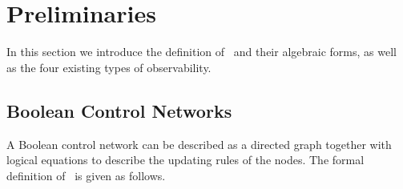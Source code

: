 \section{Preliminaries} 
\label{sec:pre}
In this section we introduce the definition of \BCNs\ and their algebraic forms, as well as the four existing types of observability. 
\subsection{Boolean Control Networks}

A Boolean control network can be described as a directed graph together with logical equations to describe the updating rules of the nodes. The formal definition of \BCN\ is given as follows. 

